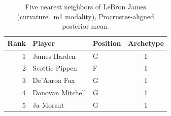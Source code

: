 \begin{table}[htbp]
  \centering\small
  \begin{tabular}{rllc}
    \toprule
    Rank & Player & Position & Archetype \\
    \midrule
    1 & James Harden & G & 1 \\
    2 & Scottie Pippen & F & 1 \\
    3 & De'Aaron Fox & G & 1 \\
    4 & Donovan Mitchell & G & 1 \\
    5 & Ja Morant & G & 1 \\
    \bottomrule
  \end{tabular}
  \caption{Five nearest neighbors of LeBron James (curvature_m1 modality), Procrustes-aligned posterior mean.}
  \label{tab:LeBron_James_neighbors_curvature_m1}
\end{table}

